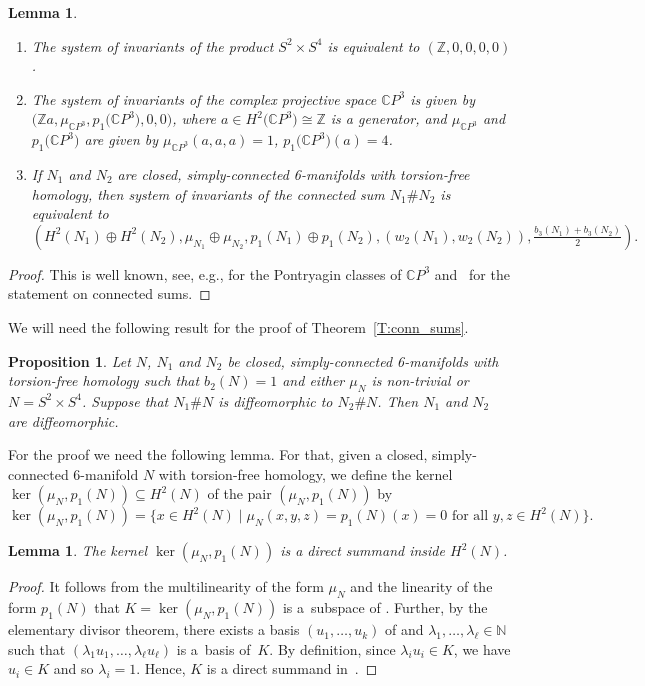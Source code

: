 \documentclass[10pt,a4paper]{amsart}
\numberwithin{equation}{section}
\newtheorem{Lemma}[Theorem]{Lemma}
\newtheorem{Proposition}[Theorem]{Proposition}
\theoremstyle{definition}
\numberwithin{table}{section}
\newcommand{\N}{\mathbb{N}}
\newcommand{\Z}{\mathbb{Z}}
\newcommand{\C}{\mathbb{C}}
\begin{document}
\begin{Lemma}\label{L:inv_examples}\qquad
	\begin{enumerate}\itemsep=0pt
		\item[$(1)$] The system of invariants of the product $S^2\times S^4$ is equivalent to $(\Z,0,0,0,0)$.
		\item[$(2)$] The system of invariants of the complex projective space $\C P^3$ is given by $\bigl(\Z a,\mu_{\C P^3},\allowbreak p_1\bigl(\C P^3\bigr),0,0\bigr)$, where $a\in H^2\bigl(\C P^3\bigr)\cong \Z$ is a generator, and $\mu_{\C P^3}$ and $p_1\bigl(\C P^3\bigr)$ are given by
$\mu_{\C P^3}(a,a,a)=1$, $p_1\bigl(\C P^3\bigr)(a)=4$.
		\item[$(3)$] If $N_1$ and $N_2$ are closed, simply-connected 6-manifolds with torsion-free homology, then system of invariants of the connected sum $N_1\# N_2$ is equivalent to
		\[ \left(H^2(N_1)\oplus H^2(N_2),\mu_{N_1}\oplus\mu_{N_2},p_1(N_1)\oplus p_1(N_2),(w_2(N_1),w_2(N_2)),\tfrac{b_3(N_1)+b_3(N_2)}{2}  \right). \]
	\end{enumerate}
\end{Lemma}
\begin{proof}
	This is well known, see, e.g., \cite[Example~15.6]{MS74} for the Pontryagin classes of $\C P^3$ and~\mbox{\cite[Lemma~4.1.4]{Re22}} for the statement on connected sums.
\end{proof}

We will need the following result for the proof of Theorem~\ref{T:conn_sums}.
\begin{Proposition}\label{P:splitting_diffeo}
	Let $N$, $N_1$ and $N_2$ be closed, simply-connected 6-manifolds with torsion-free homology such that $b_2(N)=1$ and either $\mu_N$ is non-trivial or $N=S^2\times S^4$. Suppose that $N_1\# N$ is diffeomorphic to $N_2\# N$. Then $N_1$ and $N_2$ are diffeomorphic.
\end{Proposition}
For the proof we need the following lemma. For that, given a closed, simply-connected 6-manifold $N$ with torsion-free homology, we define the kernel $\ker(\mu_N,p_1(N))\subseteq H^2(N)$ of the pair $(\mu_N,p_1(N))$ by
\[ \ker(\mu_N,p_1(N))=\bigl\{ x\in H^2(N)\mid \mu_{N}(x,y,z)=p_1(N)(x)=0\text{ for all }y,z\in H^2(N)\bigr\}. \]
\begin{Lemma}\label{L:ker_dir_sum}
	The kernel $\ker(\mu_N,p_1(N))$ is a direct summand inside $H^2(N)$.
\end{Lemma}
\begin{proof}
	It follows from the multilinearity of the form $\mu_N$ and the linearity of the form $p_1(N)$ that $K=\ker(\mu_N,p_1(N))$ is a~subspace of . Further, by the elementary divisor theorem, there exists a basis $(u_1,\dots,u_k)$ of  and $\lambda_1,\dots,\lambda_\ell\in \N$ such that $(\lambda_1 u_1,\dots,\lambda_\ell u_\ell)$ is a~basis of~$K$. By definition, since $\lambda_i u_i\in K$, we have $u_i\in K$ and so $\lambda_i=1$. Hence, $K$ is a direct summand in~.
\end{proof}
\end{document}
